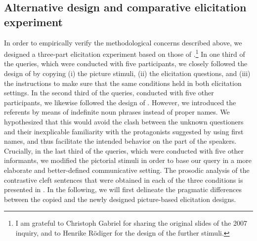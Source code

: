 \documentclass[output=paper]{langsci/langscibook}
\begin{document}
\subsection{Alternative design and comparative elicitation experiment}
\label{sec:uth:2.2}
In order to empirically verify the methodological concerns described above, we designed a three-part elicitation experiment based on those of \citet{Gabriel2007}.\footnote{I am grateful to Christoph Gabriel for sharing the original slides of the 2007 inquiry, and to Henrike Rödiger for the design of the further stimuli.} In one third of the queries, which were conducted with five participants, we closely followed the design of \citet{Gabriel2007} by copying (i) the picture stimuli, (ii) the elicitation questions, and (iii) the instructions to make sure that the same conditions held in both elicitation settings. In the second third of the queries, conducted with five other participants, we likewise followed the design of \citet{Gabriel2007}. However, we introduced the referents by means of indefinite noun phrases instead of proper names. We hypothesized that this would avoid the clash between the unknown questioners and their inexplicable familiarity with the protagonists suggested by using first names, and thus facilitate the intended behavior on the part of the speakers. Crucially, in the last third of the queries, which were conducted with five other informants, we modified the pictorial stimuli in order to base our query in a more elaborate and better-defined communicative setting. The prosodic analysis of the contrastive cleft sentences that were obtained in each of the three conditions is presented in . In the following, we will first delineate the pragmatic differences between the copied and the newly designed picture-based elicitation designs.

\end{document}
